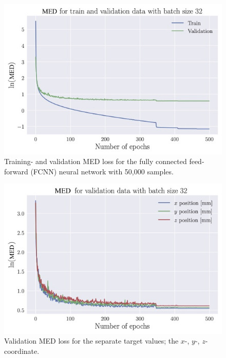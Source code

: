 \documentclass[a4paper, UKenglish, 11pt]{uiomaster}
\begin{document}
\begin{figure}[!htb]
    \centering
    \includegraphics[width=\linewidth]{figures/Simple/new_loss.jpg}
    \caption{Training- and validation MED loss for the fully connected feed-forward (FCNN) neural network with 50,000 samples.}
    \label{fig:single_dipole_accuracy}
\end{figure}

\begin{figure}[!htb]
    \centering
    \includegraphics[width=\linewidth]{figures/Simple/new_target.jpg}
    \caption{Validation MED loss for the separate target values; the $x$-, $y$-, $z$-coordinate.}
    \label{fig:single_dipole_accuracy_targets}
\end{figure}
\end{document}
